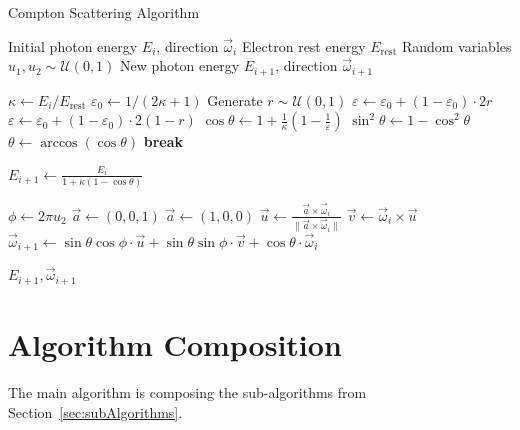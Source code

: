 \begin{algorithm}[H]
\caption{Compton Scattering Algorithm}
\label{alg:comptonScatteringBlank}
\begin{algorithmic}[1]
\Require Initial photon energy $E_i$, direction $\vec{\omega}_i$
\Require Electron rest energy $E_\text{rest}$
\Require Random variables $u_1, u_2 \sim \mathcal{U}(0, 1)$
\Ensure New photon energy $E_{i+1}$, direction $\vec{\omega}_{i+1}$

\State $\kappa \gets E_i / E_\text{rest}$
\State $\varepsilon_0 \gets 1 / (2\kappa + 1)$
\Repeat
    \State Generate $r \sim \mathcal{U}(0, 1)$
        \State $\varepsilon \gets \varepsilon_0 + (1 - \varepsilon_0) \cdot 2r$
    \Else
        \State $\varepsilon \gets \varepsilon_0 + (1 - \varepsilon_0) \cdot 2(1 - r)$
    \EndIf
    \State $\cos\theta \gets 1 + \frac{1}{\kappa} \left(1 - \frac{1}{\varepsilon}\right)$
        \State $\sin^2\theta \gets 1 - \cos^2\theta$
            \State $\theta \gets \arccos(\cos\theta)$
            \State \textbf{break}
        \EndIf
    \EndIf
{}

\State $E_{i+1} \gets \frac{E_i}{1 + \kappa (1 - \cos\theta)}$

\State $\phi \gets 2\pi u_2$
    \State $\vec{a} \gets (0, 0, 1)$
\Else
    \State $\vec{a} \gets (1, 0, 0)$
\EndIf
\State $\vec{u} \gets \frac{\vec{a} \times \vec{\omega}_i}{\|\vec{a} \times \vec{\omega}_i\|}$
\State $\vec{v} \gets \vec{\omega}_i \times \vec{u}$
\State $\vec{\omega}_{i+1} \gets \sin\theta \cos\phi \cdot \vec{u} + \sin\theta \sin\phi \cdot \vec{v} + \cos\theta \cdot \vec{\omega}_i$

\State \Return $E_{i+1}, \vec{\omega}_{i+1}$
\end{algorithmic}
\end{algorithm}


\section{Algorithm Composition}
\label{sec:algorithmComposition}
The main algorithm is composing the sub-algorithms from Section~\ref{sec:subAlgorithms}.

